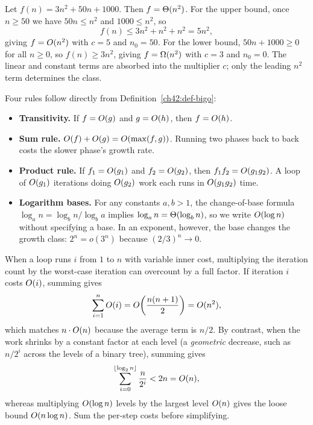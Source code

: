 \begin{example}
\label{ch42:ex-discard}
Let $f(n) = 3n^2 + 50n + 1000$. Then $f = \Theta(n^2)$. For the upper bound, once $n \ge 50$ we have $50n \le n^2$ and $1000 \le n^2$, so
\[
  f(n) \le 3n^2 + n^2 + n^2 = 5n^2,
\]
giving $f = O(n^2)$ with $c = 5$ and $n_0 = 50$. For the lower bound, $50n + 1000 \ge 0$ for all $n \ge 0$, so $f(n) \ge 3n^2$, giving $f = \Omega(n^2)$ with $c = 3$ and $n_0 = 0$. The linear and constant terms are absorbed into the multiplier $c$; only the leading $n^2$ term determines the class.
\end{example}

Four rules follow directly from Definition~\ref{ch42:def-bigo}:

\begin{itemize}
\item \textbf{Transitivity.} If $f = O(g)$ and $g = O(h)$, then $f = O(h)$.
\item \textbf{Sum rule.} $O(f) + O(g) = O(\max(f, g))$. Running two phases back to back costs the slower phase's growth rate.
\item \textbf{Product rule.} If $f_1 = O(g_1)$ and $f_2 = O(g_2)$, then $f_1 f_2 = O(g_1 g_2)$. A loop of $O(g_1)$ iterations doing $O(g_2)$ work each runs in $O(g_1 g_2)$ time.
\item \textbf{Logarithm bases.} For any constants $a, b > 1$, the change-of-base formula $\log_a n = \log_b n / \log_b a$ implies $\log_a n = \Theta(\log_b n)$, so we write $O(\log n)$ without specifying a base. In an exponent, however, the base changes the growth class: $2^n = o(3^n)$ because $(2/3)^n \to 0$.
\end{itemize}

\begin{trapbox}
When a loop runs $i$ from $1$ to $n$ with variable inner cost, multiplying the iteration count by the worst-case iteration can overcount by a full factor. If iteration $i$ costs $O(i)$, summing gives
\[
  \sum_{i=1}^n O(i) = O\!\left(\frac{n(n+1)}{2}\right) = O(n^2),
\]
which matches $n \cdot O(n)$ because the average term is $n/2$. By contrast, when the work shrinks by a constant factor at each level (a \emph{geometric} decrease, such as $n/2^i$ across the levels of a binary tree), summing gives
\[
  \sum_{i=0}^{\lfloor\log_2 n\rfloor} \frac{n}{2^i} < 2n = O(n),
\]
whereas multiplying $O(\log n)$ levels by the largest level $O(n)$ gives the loose bound $O(n\log n)$. Sum the per-step costs before simplifying.
\end{trapbox}


